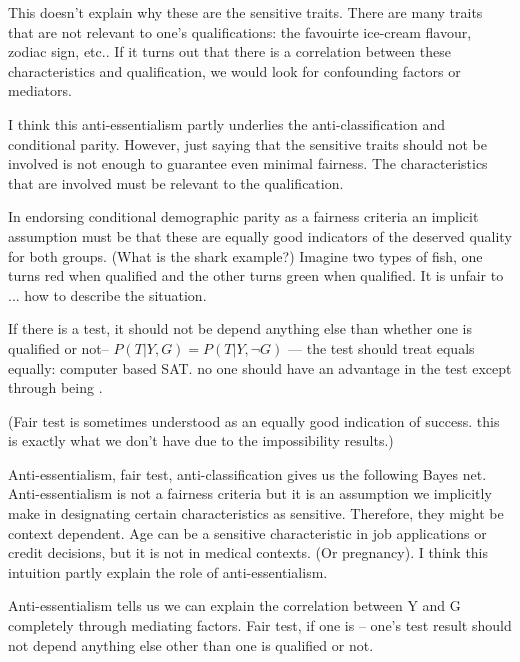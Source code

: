 \documentclass{article}
\begin{document}
This doesn't explain why these are the sensitive traits. There are many traits that are not relevant to one's qualifications: the favouirte ice-cream flavour, zodiac sign, etc.. If it turns out that there is a correlation between these characteristics and qualification, we would look for confounding factors or mediators. 

I think this anti-essentialism partly underlies the anti-classification and conditional parity. However, just saying that the sensitive traits should not be involved is not enough to guarantee even minimal fairness. The characteristics that are involved must be relevant to the qualification. 

In endorsing conditional demographic parity as a fairness criteria an implicit assumption must be that these are equally good indicators of the deserved quality for both groups. (What is the shark example?) Imagine two types of fish, one turns red when qualified and the other turns green when qualified. It is unfair to ... how to describe the situation. 


If there is a test, it should not be depend anything else than whether one is qualified or not-- $ P(T|Y, G) =  P(T|Y, \neg G)$ --- the test should treat equals equally: computer based SAT. no one should have an advantage in the test except through being . 

(Fair test is sometimes understood as an equally good indication of success. this is exactly what we don't have due to the impossibility results.)

Anti-essentialism, fair test, anti-classification gives us the following Bayes net. Anti-essentialism is not a fairness criteria but it is an assumption we implicitly make in designating certain characteristics as sensitive. Therefore, they might be context dependent. Age can be a sensitive characteristic in job applications or credit decisions, but it is not in medical contexts. (Or pregnancy). I think this intuition partly explain the role of anti-essentialism.

Anti-essentialism tells us we can explain the correlation between Y and G completely through mediating factors. Fair test, if one is -- one's test result should not depend anything else other than one is qualified or not. 
\end{document}
